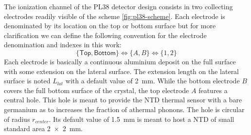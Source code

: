 The ionization channel of the PL38 detector design consists in two collecting electrodes readily visible of the scheme \ref{fig:pl38-scheme}. Each electrode is denominated by its location on the top or bottom surface but for more clarification we can define the following convention for the electrode denomination and indexes in this work:
\begin{equation}
\label{eq:pl38-convention}
\lbrace \textsf{Top}, \textsf{Bottom} \rbrace
\Leftrightarrow 
\lbrace A, B \rbrace
\Leftrightarrow
\lbrace 1, 2 \rbrace
\end{equation}
Each electrode is basically a continuous aluminium deposit on the full surface with some extension on the lateral surface. The extension length on the lateral surface is noted $L_{lat}$ with a default value of \SI{2}{\mm}. While the bottom electrode $B$ covers the full bottom surface of the crystal, the top electrode $A$ features a central hole. This hole is meant to provide the NTD thermal sensor with a bare germanium as to increases the fraction of athermal phonons. The hole is circular of radius $r_{center}$. Its default value of \SI{1.5}{\mm} is meant to host a NTD of small standard area \SI{2 x 2}{\mm}.

